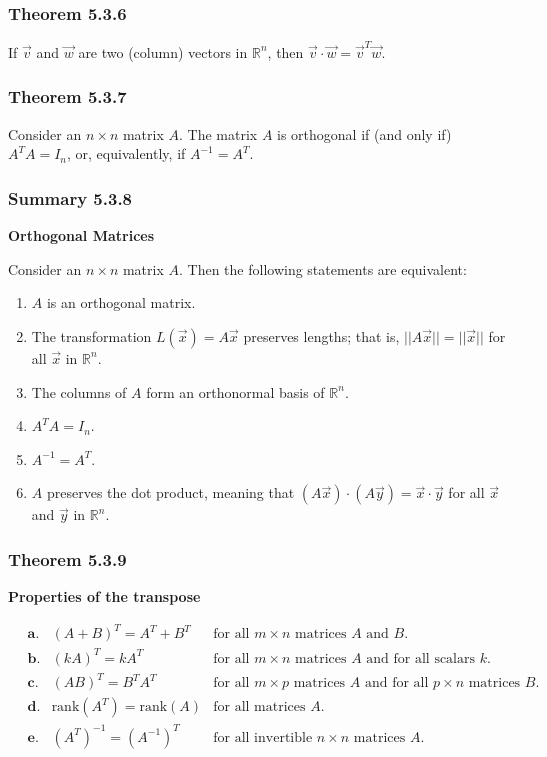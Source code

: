 \documentclass{report}
\begin{document}
\subsubsection*{Theorem 5.3.6}
\par\noindent If $\vec{v}$ and $\vec{w}$ are two (column) vectors in $\mathbb{R}^{n}$, then $\vec{v}\cdot{}\vec{w}=\vec{v}^{T}\vec{w}$.
\subsubsection*{Theorem 5.3.7}
\par\noindent Consider an $n\times{}n$ matrix $A$. The matrix $A$ is orthogonal if (and only if) $A^{T}A=I_{n}$, or, equivalently, if $A^{-1}=A^{T}$.
\subsubsection*{Summary 5.3.8}
\par\noindent\textbf{Orthogonal Matrices}
\par\noindent Consider an $n\times{}n$ matrix $A$. Then the following statements are equivalent:
\renewcommand{\labelenumi}{\textbf{\roman{enumi}.}}
\begin{enumerate}
\item $A$ is an orthogonal matrix.
\item The transformation $L(\vec{x})=A\vec{x}$ preserves lengths; that is, $||A\vec{x}||=||\vec{x}||$ for all $\vec{x}$ in $\mathbb{R}^{n}$.
\item The columns of $A$ form an orthonormal basis of $\mathbb{R}^{n}$.
\item $A^{T}A=I_{n}$.
\item $A^{-1}=A^{T}$.
\item $A$ preserves the dot product, meaning that $(A\vec{x})\cdot{}(A\vec{y})=\vec{x}\cdot{}\vec{y}$ for all $\vec{x}$ and $\vec{y}$ in $\mathbb{R}^{n}$.
\end{enumerate}
\subsubsection*{Theorem 5.3.9}
\par\noindent\textbf{Properties of the transpose}
\par\noindent $\displaystyle \quad\begin{array}{rll}\textbf{a.}&(A+B)^{T}=A^{T}+B^{T}&\textrm{for all }m\times{}n\textrm{ matrices }A\textrm{ and }B.\\{} \textbf{b.}&(kA)^{T}=kA^{T}&\textrm{for all }m\times{}n\textrm{ matrices }A\textrm{ and for all scalars }k.\\{} \textbf{c.}&(AB)^{T}=B^{T}A^{T}&\textrm{for all }m\times{}p\textrm{ matrices }A\textrm{ and for all }p\times{}n\textrm{ matrices }B.\\{} \textbf{d.}&\textrm{rank}(A^{T})=\textrm{rank}(A)&\textrm{for all matrices }A.\\{} \textbf{e.}&(A^{T})^{-1}=(A^{-1})^{T}&\textrm{for all invertible }n\times{}n\textrm{ matrices }A.\end{array}$
\end{document}
